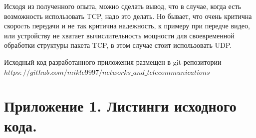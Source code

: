 \documentclass[a4paper,14pt]{extarticle}
\begin{document}
Исходя из полученного опыта, можно сделать вывод, что в случае, когда есть возможность использовать TCP, надо это делать. Но бывает, что очень критична скороcть передачи и не так критична надежность, к примеру при передче видео, или устройству не хватает вычислительность мощности для своевременной обработки структуры пакета TCP, в этом случае стоит использовать UDP.

Исходный код разработанного приложения размещен в git-репозитории $https://github.com/mikle9997/networks\_and\_telecommunications$

\section{Приложение 1. Листинги исходного кода. }























































\end{document}
